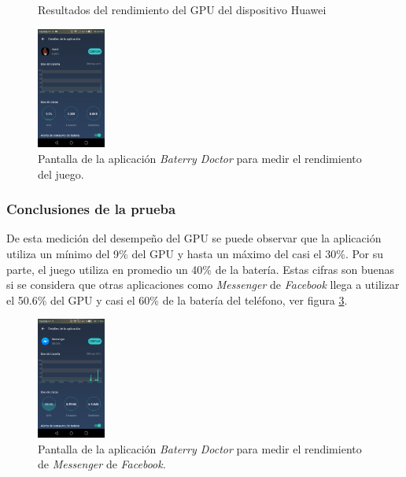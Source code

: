 \begin{figure}
   
  \caption{Resultados del rendimiento del GPU del dispositivo Huawei}
  \label{fig:GPUHuawei}
\end{figure} 
                \begin{figure}[h]
                        \centering
                        \includegraphics[width=0.2\textwidth]{04ResultadosObetnidos/imagenes/baterry02.png}
                        \caption{Pantalla de la aplicación \textit{Baterry Doctor} para medir el 
                        rendimiento del juego.}
                        \label{fig:BateriaYolotl}
                \end{figure}
\subsubsection{Conclusiones de la prueba}
De esta medición del desempeño del GPU se puede observar que la aplicación 
utiliza un mínimo del 9\% del GPU y hasta un máximo del casi el 30\%. Por su 
parte, el juego utiliza en promedio un 40\% de la batería. Estas cifras son 
buenas si se considera que otras aplicaciones como \textit{Messenger} de 
\textit{Facebook} llega a utilizar el 50.6\% del GPU y casi el 60\% de la batería 
del teléfono, ver figura \ref{fig:BateriaFacebook}. 
\begin{figure}[h]
                        \centering
                        \includegraphics[width=0.2\textwidth]{04ResultadosObetnidos/imagenes/baterry01.png}
                        \caption{Pantalla de la aplicación \textit{Baterry Doctor} para medir el 
                        rendimiento de \textit{Messenger} de \textit{Facebook}.}
                        \label{fig:BateriaFacebook}
                \end{figure}
